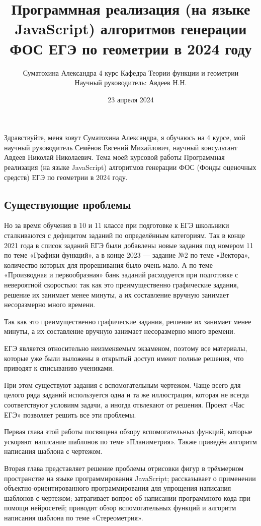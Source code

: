 \documentclass[a4paper, 12pt]{extarticle}
\title{Программная реализация (на языке JavaScript) алгоритмов генерации ФОС ЕГЭ по геометрии в 2024 году}
\author{Суматохина Александра 4 курс Кафедра Теории функции и геометрии\\Научный руководитель: Авдеев Н.Н.}
\date{23 апреля 2024}
\begin{document}
\maketitle

Здравствуйте, меня зовут Суматохина Александра, я обучаюсь на 4 курсе, мой научный руководитель Семёнов Евгений Михайлович, научный консультант Авдеев Николай Николаевич. Тема моей курсовой работы Программная реализация (на языке JavaScript) алгоритмов генерации ФОС (Фонды оценочных средств) ЕГЭ по геометрии в 2024 году.

\subsection*{Существующие проблемы}
Но за время обучения в 10 и 11 классе при подготовке к ЕГЭ школьники сталкиваются с дефицитом заданий по определённым категориям.
Так в конце 2021 года в список заданий ЕГЭ были добавлены новые задания под номером 11 по теме «Графики функций», а в конце 2023 — задание №2 по теме «Вектора», количество которых для прорешивания было очень мало. 
А по теме «Производная и первообразная» банк заданий расходуется при подготовке с невероятной скоростью:
так как это преимущественно графические задания, решение их занимает менее минуты, а их составление вручную занимает несоразмерно много времени.

Так как это преимущественно графические задания, решение их занимает менее минуты, а их составление вручную занимает несоразмерно много времени.

ЕГЭ является относительно неизменяемым экзаменом, поэтому все материалы, которые уже были выложены в открытый доступ имеют полные решения, что приводят к списыванию учениками.

При этом существуют задания с вспомогательным чертежом. Чаще всего для целого ряда заданий используется одна и та же иллюстрация, которая не всегда соответствуют условиям задачи, а иногда отвлекают от решения.
Проект «Час ЕГЭ» позволяет решить все эти проблемы.

Первая глава этой работы посвящена обзору вспомогательных функций, которые ускоряют написание шаблонов по теме «Планиметрия». Также приведён алгоритм написания шаблона с чертежом.

Вторая глава представляет решение проблемы отрисовки фигур в трёхмерном пространстве на языке программирования JavaScript; рассказывает о применении объектно-ориентированного программирования для упрощения написания шаблонов с чертежом; затрагивает вопрос об написании программного кода при помощи нейросетей; приводит обзор вспомогательных функций и алгоритм написания шаблона по теме «Стереометрия».
\end{document}
